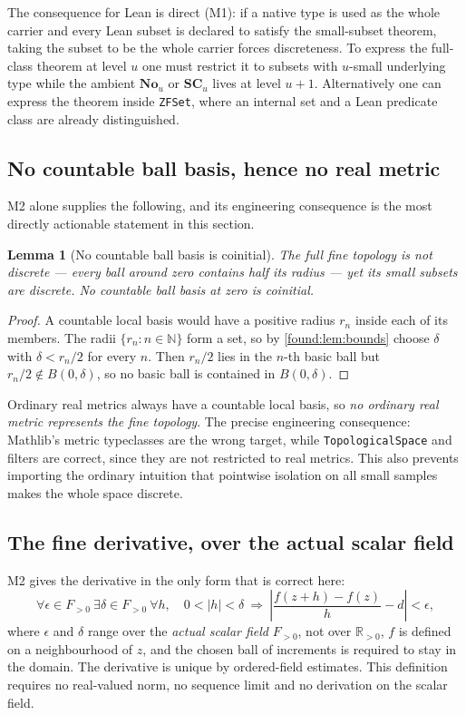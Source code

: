 \documentclass[11pt,letterpaper]{article}
\numberwithin{equation}{section}
\newtheorem{lemma}[theorem]{Lemma}
\theoremstyle{definition}
\theoremstyle{remark}
\newcommand{\No}{\mathbf{No}}
\newcommand{\SC}{\mathbf{SC}}
\newcommand{\R}{\mathbb R}
\newcommand{\N}{\mathbb N}
\begin{document}
The consequence for Lean is direct (M1): if a native type is used as the whole
carrier and every Lean subset is declared to satisfy the small-subset theorem,
taking the subset to be the whole carrier forces discreteness. To express the
full-class theorem at level $u$ one must restrict it to subsets with $u$-small
underlying type while the ambient $\No_u$ or $\SC_u$ lives at level $u+1$.
Alternatively one can express the theorem inside \texttt{ZFSet}, where an
internal set and a Lean predicate class are already distinguished.

\subsection{No countable ball basis, hence no real metric}
\label{found:sub:nometric}
M2 alone supplies the following, and its engineering consequence is the most
directly actionable statement in this section.

\begin{lemma}[No countable ball basis is coinitial]\label{found:lem:nometric}
The full fine topology is not discrete --- every ball around zero contains half
its radius --- yet its small subsets are discrete. No countable ball basis at
zero is coinitial.
\end{lemma}
\begin{proof}
A countable local basis would have a positive radius $r_n$ inside each of its
members. The radii $\{r_n:n\in\N\}$ form a set, so by \cref{found:lem:bounds}
choose $\delta$ with $\delta<r_n/2$ for every $n$. Then $r_n/2$ lies in the
$n$-th basic ball but $r_n/2\notin B(0,\delta)$, so no basic ball is contained
in $B(0,\delta)$.
\end{proof}

Ordinary real metrics always have a countable local basis, so \emph{no ordinary
real metric represents the fine topology}. The precise engineering consequence:
Mathlib's metric typeclasses are the wrong target, while
\texttt{TopologicalSpace} and filters are correct, since they are not restricted
to real metrics. This also prevents importing the ordinary intuition that
pointwise isolation on all small samples makes the whole space discrete.

\subsection{The fine derivative, over the actual scalar field}
\label{found:sub:derivative}
M2 gives the derivative in the only form that is correct here:
\begin{equation}\label{found:eq:derivative}
 \forall\epsilon\in F_{>0}\ \exists\delta\in F_{>0}\ \forall h,\quad
 0<|h|<\delta\ \Longrightarrow\
 \left|\frac{f(z+h)-f(z)}{h}-d\right|<\epsilon,
\end{equation}
where $\epsilon$ and $\delta$ range over the \emph{actual scalar field}
$F_{>0}$, not over $\R_{>0}$, $f$ is defined on a neighbourhood of $z$, and the
chosen ball of increments is required to stay in the domain. The derivative is
unique by ordered-field estimates. This definition requires no real-valued norm,
no sequence limit and no derivation on the scalar field.
\end{document}
